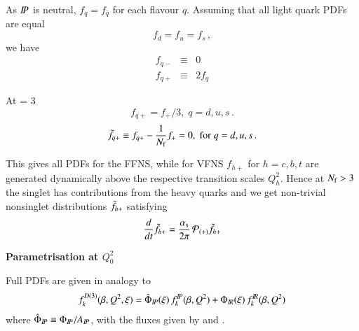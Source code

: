 As ${I\!P}$ is neutral, $f_{q} = f_{\bar q}$ for each flavour $q$.
Assuming that all light quark PDFs are equal
\begin{equation}
f_d = f_u = f_s
\,,
\end{equation}
we have
\begin{subequations}
\label{eq:pm}
\begin{eqnarray}
f_{q-} &\equiv& 0
\\
f_{q+} &\equiv& 2 f_q
\end{eqnarray}
\end{subequations}

At \NF = 3
\begin{equation}
\label{eq:fq3}
f_{q+} = f_{+}/3,\; q = d,u,s
\,.
\end{equation}
\ie
\begin{equation}
\Sgl q \equiv f_{q+} - \frac{1}{\NF}f_{+}
 = 0,\;\mbox{for}\; q = d,u,s
\,.
\end{equation}

This gives all PDFs for the FFNS, while for VFNS 
$f_{h+}$ for $h=c,b,t$ are generated dynamically above the respective
transition scales $Q_h^2$.
Hence at $\NF > 3$ the singlet has contributions from the heavy quarks
and we get non-trivial nonsinglet distributions $\Sgl{h}$ satisfying
\begin{equation}
\label{eq:nsevol}
\frac{d}{dt}\Sgl h = \asotp\, \AP_{(+)} \Sgl h
\end{equation}

{\bf Parametrisation at {$Q_0^2$}} \\
\label{sec:Par}

Full PDFs are given in analogy to 
\begin{equation}
f_k^{D(3)}(\beta,Q^2,\xi) =
\hat\Phi_{I\!P}(\xi)\, f^{I\!P}_k(\beta,Q^2)
+
\Phi_{I\!R}(\xi)\, f^{I\!R}_k(\beta,Q^2)
\end{equation}
where $\hat\Phi_{I\!P} \equiv \Phi_{I\!P}/A_{I\!P}$,
with the fluxes given by  and .

